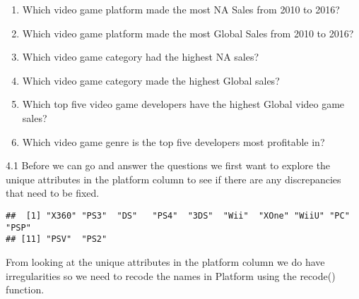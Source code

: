 \documentclass[
]{article}
\newenvironment{Shaded}{\begin{snugshade}}{\end{snugshade}}
\newcommand{\CommentTok}[1]{\textcolor[rgb]{0.56,0.35,0.01}{\textit{#1}}}
\newcommand{\FunctionTok}[1]{\textcolor[rgb]{0.00,0.00,0.00}{#1}}
\newcommand{\NormalTok}[1]{#1}
\newcommand{\SpecialCharTok}[1]{\textcolor[rgb]{0.00,0.00,0.00}{#1}}
\begin{document}
\begin{enumerate}
\def\labelenumi{\arabic{enumi}.}
\item
  Which video game platform made the most NA Sales from 2010 to 2016?
\item
  Which video game platform made the most Global Sales from 2010 to
  2016?
\item
  Which video game category had the highest NA sales?
\item
  Which video game category made the highest Global sales?
\item
  Which top five video game developers have the highest Global video
  game sales?
\item
  Which video game genre is the top five developers most profitable in?
\end{enumerate}

4.1 Before we can go and answer the questions we first want to explore
the unique attributes in the platform column to see if there are any
discrepancies that need to be fixed.

\begin{Shaded}
\end{Shaded}

\begin{verbatim}
##  [1] "X360" "PS3"  "DS"   "PS4"  "3DS"  "Wii"  "XOne" "WiiU" "PC"   "PSP" 
## [11] "PSV"  "PS2"
\end{verbatim}

From looking at the unique attributes in the platform column we do have
irregularities so we need to recode the names in Platform using the
recode() function.
\end{document}
